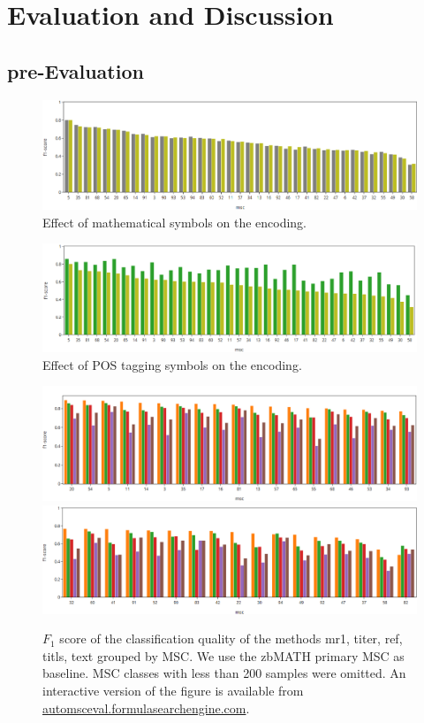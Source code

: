 \section{Evaluation and Discussion}\label{sec:eval}

\subsection{pre-Evaluation}

\begin{figure}[h]
  \centering
  \includegraphics[width=1.1\textwidth]{mathEncoding.png}
  \caption{Effect of mathematical symbols on the encoding.}
\end{figure}

\begin{figure}[h]
  \centering
  \includegraphics[width=1.1\textwidth]{POSeffekt.png}
  \caption{Effect of POS tagging symbols on the encoding.}
\end{figure}

\begin{figure}[h]
  \centering
  \includegraphics[width=1.1\textwidth]{overview1.png}
  \includegraphics[width=1.1\textwidth]{overview2.png}
  \caption{$F_1$ score of the classification quality of the methods mr1, titer, ref, titls, text grouped by MSC. We use the zbMATH primary MSC as baseline. MSC classes with less than 200 samples were omitted. An interactive version of the figure is available from \url{automsceval.formulasearchengine.com}.}
\end{figure}


